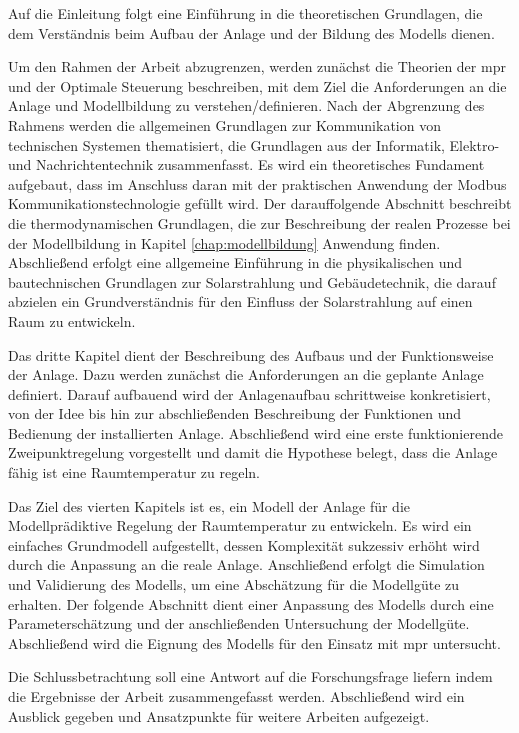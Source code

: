 Auf die Einleitung folgt eine Einführung in die theoretischen Grundlagen, die dem Verständnis beim Aufbau der Anlage und der Bildung des Modells dienen.

Um den Rahmen der Arbeit abzugrenzen, werden zunächst die Theorien der \acrlong{mpr} und der Optimale Steuerung beschreiben, mit dem Ziel die Anforderungen an die Anlage und Modellbildung zu verstehen/definieren.
Nach der Abgrenzung des Rahmens werden die allgemeinen Grundlagen zur Kommunikation von technischen Systemen thematisiert, die Grundlagen aus der Informatik, Elektro- und Nachrichtentechnik zusammenfasst. Es wird ein theoretisches Fundament aufgebaut, dass im Anschluss daran mit der praktischen Anwendung der Modbus Kommunikationstechnologie gefüllt wird.
Der darauffolgende Abschnitt beschreibt die thermodynamischen Grundlagen, die zur Beschreibung der realen Prozesse bei der Modellbildung in Kapitel \ref{chap:modellbildung} Anwendung finden.
Abschließend erfolgt eine allgemeine Einführung in die physikalischen und bautechnischen Grundlagen zur Solarstrahlung und Gebäudetechnik, die darauf abzielen ein Grundverständnis für den Einfluss der Solarstrahlung auf einen Raum zu entwickeln.

Das dritte Kapitel dient der Beschreibung des Aufbaus und der Funktionsweise der Anlage. Dazu werden zunächst die Anforderungen an die geplante Anlage definiert. Darauf aufbauend wird der Anlagenaufbau schrittweise konkretisiert, von der Idee bis hin zur abschließenden Beschreibung der Funktionen und Bedienung der installierten Anlage. Abschließend wird eine erste funktionierende Zweipunktregelung vorgestellt und damit die Hypothese belegt, dass die Anlage fähig ist eine Raumtemperatur zu regeln.

Das Ziel des vierten Kapitels ist es, ein Modell der Anlage für die Modellprädiktive Regelung der Raumtemperatur zu entwickeln. Es wird ein einfaches Grundmodell aufgestellt, dessen Komplexität sukzessiv erhöht wird durch die Anpassung an die reale Anlage. Anschließend erfolgt die Simulation und Validierung des Modells, um eine Abschätzung für die Modellgüte zu erhalten. Der folgende Abschnitt dient einer Anpassung des Modells durch eine Parameterschätzung und der anschließenden Untersuchung der Modellgüte. Abschließend wird die Eignung des Modells für den Einsatz mit \acrlong{mpr} untersucht.
  
 Die Schlussbetrachtung soll eine Antwort auf die Forschungsfrage liefern indem die Ergebnisse der Arbeit zusammengefasst werden. Abschließend wird ein Ausblick gegeben und Ansatzpunkte für weitere Arbeiten aufgezeigt.